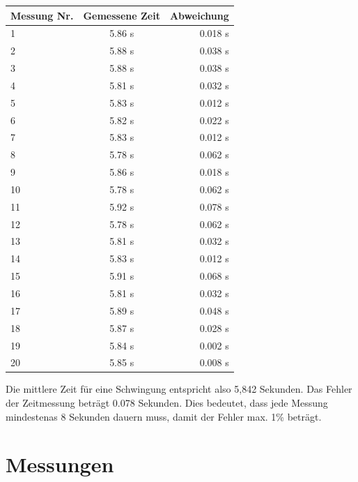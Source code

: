 \documentclass[12pt, a4paper, twoside]{article}
\begin{document}
      \begin{center}
    \begin{tabular}{l|c|r} %
      \textbf{Messung Nr.} & \textbf{Gemessene Zeit} & \textbf{Abweichung}\\
    
      \hline 
      1 & 5.86 s & 0.018 s \\
      2 & 5.88 s & 0.038 s \\
      3 & 5.88 s & 0.038 s \\
      4 & 5.81 s & 0.032 s \\
      5 & 5.83 s& 0.012 s \\
      6 & 5.82 s & 0.022 s \\
      7 & 5.83 s & 0.012 s \\
      8 & 5.78 s & 0.062 s \\
      9 & 5.86 s & 0.018 s \\
      10 & 5.78 s & 0.062 s \\
      11 & 5.92 s & 0.078 s \\
      12 & 5.78 s & 0.062 s \\
      13 & 5.81 s & 0.032 s \\
      14 & 5.83 s & 0.012 s \\
      15 & 5.91 s & 0.068 s \\
      16 & 5.81 s & 0.032 s \\
      17 & 5.89 s & 0.048 s \\
      18 & 5.87 s & 0.028 s \\
      19 & 5.84 s & 0.002 s \\
      20 & 5.85 s & 0.008 s \\

    \end{tabular}
  \end{center}
    Die mittlere Zeit für eine Schwingung entspricht also 5,842 Sekunden.
    Das Fehler der Zeitmessung beträgt 0.078 Sekunden. Dies bedeutet, dass jede Messung mindestenas 8 Sekunden dauern muss, damit der Fehler max. 1\% beträgt.
    \pagebreak
    \section{Messungen}
\end{document}
